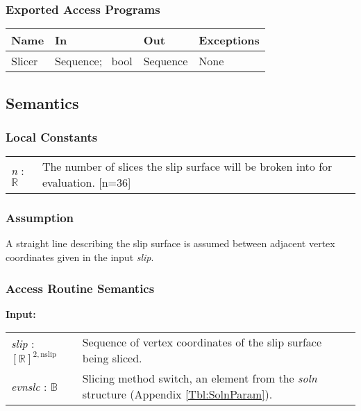 \documentclass[12pt, titlepage]{article}
\begin{document}
\subsubsection{Exported Access Programs}

\begin{center}
	\renewcommand*{\arraystretch}{1.5}
	\begin{tabular} {p{}  p{}  p{} 
			p{} } \hline 
		\textbf{Name} & \textbf{In} & \textbf{Out} & \textbf{Exceptions} \\ 
		\hline
  Slicer & Sequence; ~\newline bool & Sequence & None \\ \hline

\end{tabular}
\end{center}

\subsection{Semantics}

\subsubsection{Local Constants}
\renewcommand*{\arraystretch}{1.5}
\begin{longtable}{p{} p{}}
  \textit{n} : $\mathbb{R}$ & The number of slices the slip surface
  will be broken into for evaluation. [n=36]\\
\end{longtable}

\subsubsection{Assumption}
A straight line describing the slip surface is assumed between
adjacent vertex coordinates given in the input \textit{slip}.

\subsubsection{Access Routine Semantics}
\textbf{Input:} 
\renewcommand*{\arraystretch}{1.5}
\begin{longtable}{p{} p{}}
  \textit{slip} : $[\mathbb{R}]^{2,\text{nslip}}$ & Sequence of vertex
  coordinates of the slip surface being sliced. \\

  \textit{evnslc} : $\mathbb{B}$ & Slicing method switch, an element
  from the \textit{soln} structure (Appendix
  \ref{Tbl:SolnParam}).\\
\end{longtable}
\end{document}
